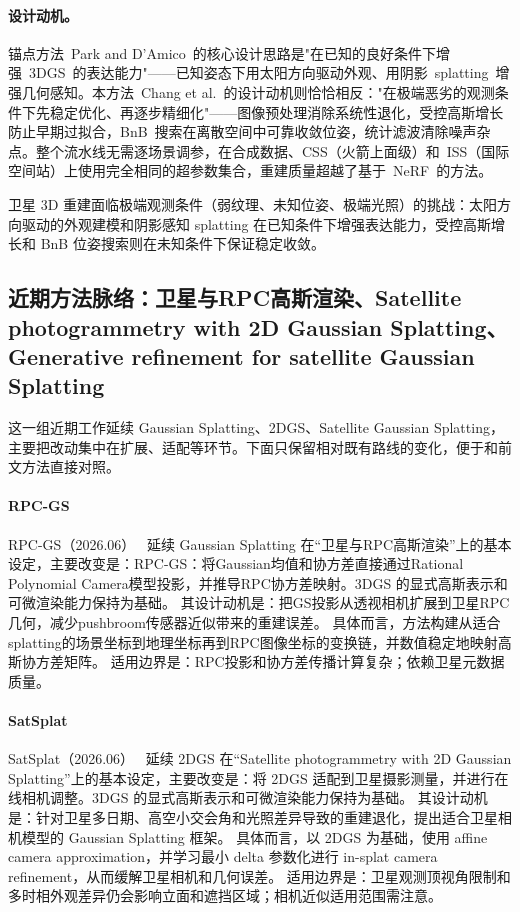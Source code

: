\paragraph{设计动机。}
锚点方法~Park and D'Amico~的核心设计思路是"在已知的良好条件下增强~3DGS~的表达能力"——已知姿态下用太阳方向驱动外观、用阴影~splatting~增强几何感知。本方法~Chang et al.~的设计动机则恰恰相反："在极端恶劣的观测条件下先稳定优化、再逐步精细化"——图像预处理消除系统性退化，受控高斯增长防止早期过拟合，BnB~搜索在离散空间中可靠收敛位姿，统计滤波清除噪声杂点。整个流水线无需逐场景调参，在合成数据、CSS（火箭上面级）和~ISS（国际空间站）上使用完全相同的超参数集合，重建质量超越了基于~NeRF~的方法。

\begin{takeaway}
卫星 3D 重建面临极端观测条件（弱纹理、未知位姿、极端光照）的挑战：太阳方向驱动的外观建模和阴影感知 splatting 在已知条件下增强表达能力，受控高斯增长和 BnB 位姿搜索则在未知条件下保证稳定收敛。
\end{takeaway}


\subsection{近期方法脉络：卫星与RPC高斯渲染、Satellite photogrammetry with 2D Gaussian Splatting、Generative refinement for satellite Gaussian Splatting}

这一组近期工作延续 Gaussian Splatting、2DGS、Satellite Gaussian Splatting，主要把改动集中在扩展、适配等环节。下面只保留相对既有路线的变化，便于和前文方法直接对照。

\paragraph{RPC-GS}
RPC-GS（2026.06）~\cite{2606_06690} 延续 Gaussian Splatting 在“卫星与RPC高斯渲染”上的基本设定，主要改变是：RPC-GS：将Gaussian均值和协方差直接通过Rational Polynomial Camera模型投影，并推导RPC协方差映射。3DGS 的显式高斯表示和可微渲染能力保持为基础。
其设计动机是：把GS投影从透视相机扩展到卫星RPC几何，减少pushbroom传感器近似带来的重建误差。
具体而言，方法构建从适合splatting的场景坐标到地理坐标再到RPC图像坐标的变换链，并数值稳定地映射高斯协方差矩阵。
适用边界是：RPC投影和协方差传播计算复杂；依赖卫星元数据质量。

\paragraph{SatSplat}
SatSplat（2026.06）~\cite{2606_28581} 延续 2DGS 在“Satellite photogrammetry with 2D Gaussian Splatting”上的基本设定，主要改变是：将 2DGS 适配到卫星摄影测量，并进行在线相机调整。3DGS 的显式高斯表示和可微渲染能力保持为基础。
其设计动机是：针对卫星多日期、高空小交会角和光照差异导致的重建退化，提出适合卫星相机模型的 Gaussian Splatting 框架。
具体而言，以 2DGS 为基础，使用 affine camera approximation，并学习最小 delta 参数化进行 in-splat camera refinement，从而缓解卫星相机和几何误差。
适用边界是：卫星观测顶视角限制和多时相外观差异仍会影响立面和遮挡区域；相机近似适用范围需注意。

